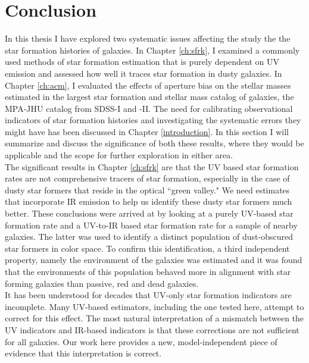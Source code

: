 \chapter{Conclusion}
\label{conclusion}

In this thesis I have explored two systematic issues affecting the study the the star formation histories of galaxies. In Chapter \ref{ch:sfrk}, I examined a commonly used methods of star formation estimation that is purely dependent on UV emission and assessed how well it traces star formation in dusty galaxies. In Chapter \ref{ch:acm}, I evaluated the effects of aperture bias on the stellar masses estimated in the largest star formation and stellar mass catalog of galaxies, the MPA-JHU catalog from SDSS-I and -II. The need for calibrating observational indicators of star formation histories and investigating the systematic errors they might have has been discussed in Chapter \ref{introduction}. In this section I will summarize and discuss the significance of both these results, where they would be applicable and the scope for further exploration in either area.\\

The significant results in Chapter \ref{ch:sfrk} are that the UV based star formation rates are not comprehensive tracers of star formation, especially in the case of dusty star formers that reside in the optical ``green valley." We need estimates that
incorporate IR emission to help us identify these dusty star formers much better. These conclusions were arrived at by looking at a purely UV-based star formation rate and a UV-to-IR based star formation rate for a sample of nearby galaxies. The latter was used to identify a distinct population of dust-obscured star formers in color space. To confirm this identification, a third independent property, namely the environment of the galaxies was estimated and it was found that the environments of this population behaved more in alignment with star forming galaxies than passive, red and dead galaxies.\\

It has been understood for decades that UV-only star formation
indicators are incomplete. Many UV-based estimators, including
the one tested here, attempt to correct for this effect. 
The most natural interpretation of a mismatch between
the UV indicators and IR-based indicators is that these 
corrections are not sufficient for all galaxies. Our work
here provides a new, model-independent piece of evidence 
that this interpretation is correct.

